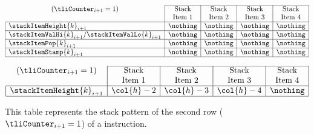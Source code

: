 \begin{figure}[h!]
\[
	\begin{array}{|l|c|c|c|c|} \cline{2-5}
	\multicolumn{1}{c|}{(\tliCounter_{i + 1} = 1)}             & \multicolumn{1}{c|}{\text{Stack}}  & \multicolumn{1}{c|}{\text{Stack}}  & \multicolumn{1}{c|}{\text{Stack}}  & \multicolumn{1}{c|}{\text{Stack}} \\
	\multicolumn{1}{c|}{}                                      & \multicolumn{1}{c|}{\text{Item 1}} & \multicolumn{1}{c|}{\text{Item 2}} & \multicolumn{1}{c|}{\text{Item 3}} & \multicolumn{1}{c|}{\text{Item 4}} \\ \hline
	\stackItemHeight{k}_{i + 1}                                & \nothing                           & \nothing                           & \nothing                           & \nothing \\ \hline 
	\stackItemValHi{k}_{i + 1} / \stackItemValLo{k}_{i + 1}    & \nothing                           & \nothing                           & \nothing                           & \nothing \\ \hline
	\stackItemPop{k}_{i + 1}                                   & \nothing                           & \nothing                           & \nothing                           & \nothing \\ \hline
	\stackItemStamp{k}_{i + 1}                                 & \nothing                           & \nothing                           & \nothing                           & \nothing \\ \hline
	\end{array}
\]
\caption{%
This table represents the stack pattern of the second row ($\tliCounter_{i + 1} = 1$) of a  instruction.}
\[
	\begin{array}{|l|r|r|r|c|} \cline{2-5}
	\multicolumn{1}{c|}{(\tliCounter_{i + 1} = 1)}          & \multicolumn{1}{c|}{\text{Stack}}  & \multicolumn{1}{c|}{\text{Stack}}  & \multicolumn{1}{c|}{\text{Stack}}  & \multicolumn{1}{c|}{\text{Stack}}  \\
	\multicolumn{1}{c|}{}                                   & \multicolumn{1}{c|}{\text{Item 1}} & \multicolumn{1}{c|}{\text{Item 2}} & \multicolumn{1}{c|}{\text{Item 3}} & \multicolumn{1}{c|}{\text{Item 4}} \\ \hline
	\stackItemHeight{k}_{i + 1}                             & \col{h} - 2                        & \col{h} - 3                        & \col{h} - 4                        & \nothing                           \\ \hline 

\end{array}\]
\end{figure}
